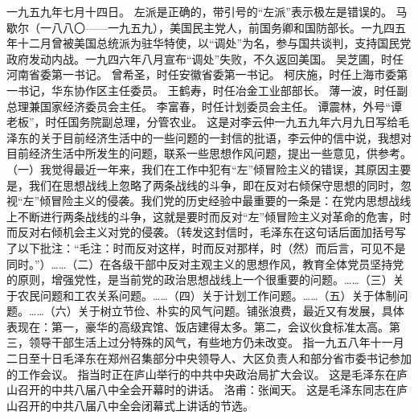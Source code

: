 \begin{maonote}
一九五九年七月十四日。
左派是正确的，带引号的“左派”表示极左是错误的。
马歇尔（一八八〇——一九五九），美国民主党人，前国务卿和国防部长。一九四五年十二月曾被美国总统派为驻华特使，以“调处”为名，参与国共谈判，支持国民党政府发动内战。一九四六年八月宣布“调处”失败，不久返回美国。
吴芝圃，时任河南省委第一书记。
曾希圣，时任安徽省委第一书记。
柯庆施，时任上海市委第一书记，华东协作区主任委员。
王鹤寿，时任冶金工业部部长。
薄一波，时任副总理兼国家经济委员会主任。
李富春，时任计划委员会主任。
谭震林，外号“谭老板”，时任国务院副总理，分管农业。
这是对李云仲一九五九年六月九日写给毛泽东的关于目前经济生活中的一些问题的一封信的批语，李云仲的信中说，我想对目前经济生活中所发生的问题，联系一些思想作风问题，提出一些意见，供参考。（一）我觉得最近一年来，我们在工作中犯有“左”倾冒险主义的错误，其原因主要是，我们在思想战线上忽略了两条战线的斗争，即在反对右倾保守思想的同时，忽视“左”倾冒险主义的侵袭。我们党的历史经验中最重要的一条是：在党内思想战线上不断进行两条战线的斗争，这就是要时而反对“左”倾冒险主义对革命的危害，时而反对右倾机会主义对党的侵袭。（转发这封信时，毛泽东在这句话后面加括号写了以下批注：“毛注：时而反对这样，时而反对那样，时（然）而后言，可见不是同时。”）……（二）在各级干部中反对主观主义的思想作风，教育全体党员坚持党的原则，增强党性，是当前党的政治思想战线上一个很重要的问题。……（三）关于农民问题和工农关系问题。……（四）关于计划工作问题。……（五）关于体制问题。……（六）关于树立节俭、朴实的风气问题。铺张浪费，最近又有发展，具体表现在：第一，豪华的高级宾馆、饭店建得太多。第二，会议伙食标准太高。第三，领导干部生活上过分特殊的风气，有些地方仍未改变。
指一九五八年十一月二日至十日毛泽东在郑州召集部分中央领导人、大区负责人和部分省市委书记参加的工作会议。
指当时正在庐山举行的中共中央政治局扩大会议。
这是毛泽东在庐山召开的中共八届八中全会开幕时的讲话。
洛甫：张闻天。
这是毛泽东同志在庐山召开的中共八届八中全会闭幕式上讲话的节选。
\end{maonote}
